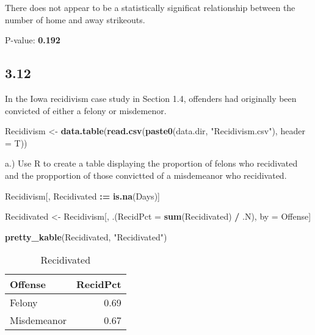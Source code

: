 \documentclass[
  12pt,
]{report}
\newenvironment{Shaded}{\begin{snugshade}}{\end{snugshade}}
\newcommand{\DataTypeTok}[1]{\textcolor[rgb]{0.13,0.29,0.53}{#1}}
\newcommand{\ErrorTok}[1]{\textcolor[rgb]{0.64,0.00,0.00}{\textbf{#1}}}
\newcommand{\KeywordTok}[1]{\textcolor[rgb]{0.13,0.29,0.53}{\textbf{#1}}}
\newcommand{\NormalTok}[1]{#1}
\newcommand{\OperatorTok}[1]{\textcolor[rgb]{0.81,0.36,0.00}{\textbf{#1}}}
\newcommand{\StringTok}[1]{\textcolor[rgb]{0.31,0.60,0.02}{#1}}
\begin{document}
There does not appear to be a statistically significat relationship
between the number of home and away strikeouts.

P-value: \textbf{0.192}

\hypertarget{section-11}{%
\subsection{3.12}\label{section-11}}

In the Iowa recidivism case study in Section 1.4, offenders had
originally been convicted of either a felony or misdemenor.

\begin{Shaded}
\begin{Highlighting}[]
\NormalTok{Recidivism <-}\StringTok{ }\KeywordTok{data.table}\NormalTok{(}\KeywordTok{read.csv}\NormalTok{(}\KeywordTok{paste0}\NormalTok{(data.dir, }\StringTok{"Recidivism.csv"}\NormalTok{),}
                               \DataTypeTok{header =}\NormalTok{ T))}
\end{Highlighting}
\end{Shaded}

a.) Use R to create a table displaying the proportion of felons who
recidivated and the propportion of those convictted of a misdemeanor who
recidivated.

\begin{Shaded}
\begin{Highlighting}[]
\NormalTok{Recidivism[, Recidivated }\OperatorTok{:}\ErrorTok{=}\StringTok{ }\KeywordTok{is.na}\NormalTok{(Days)]}

\NormalTok{Recidivated <-}\StringTok{ }\NormalTok{Recidivism[, .(}\DataTypeTok{RecidPct =} \KeywordTok{sum}\NormalTok{(Recidivated) }\OperatorTok{/}\StringTok{ }\NormalTok{.N), by =}\StringTok{ }\NormalTok{Offense]}

\KeywordTok{pretty_kable}\NormalTok{(Recidivated, }\StringTok{"Recidivated"}\NormalTok{)}
\end{Highlighting}
\end{Shaded}

\begin{table}[!h]

\caption{\label{tab:unnamed-chunk-23}Recidivated}
\centering
\begin{tabular}[t]{l|r}
\hline
Offense & RecidPct\\
\hline
Felony & 0.69\\
\hline
Misdemeanor & 0.67\\
\hline
\end{tabular}
\end{table}
\end{document}
